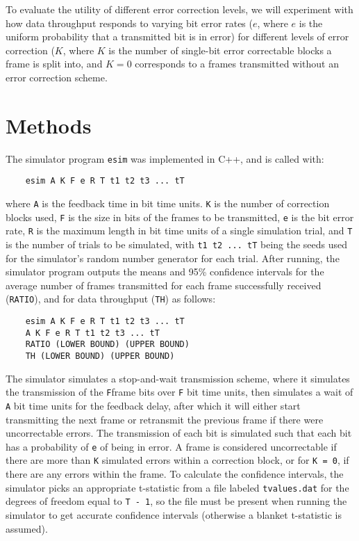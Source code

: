 \documentclass[twocolumn]{article}
\begin{document}
    To evaluate the utility of different error correction levels, we will experiment with 
    how data throughput responds to varying bit error rates ($e$, where $e$ is the 
    uniform probability that a transmitted bit is in error) for different levels of 
    error correction ($K$, where $K$ is the number of single-bit error correctable blocks 
    a frame is split into, and $K=0$ corresponds to a frames transmitted without an error 
    correction scheme. 

\section*{Methods}

    The simulator program \verb|esim| was implemented in C++, and is called with:
    \begin{lstlisting}
    esim A K F e R T t1 t2 t3 ... tT
    \end{lstlisting}
    where \verb|A| is the feedback time in bit time units. \verb|K| is the number
    of correction blocks used, \verb|F| is the size in bits of the frames to be transmitted,
    \verb|e| is the bit error rate, \verb|R| is the maximum length in bit time units of
    a single simulation trial, and \verb|T| is the number of trials to be simulated, with 
    \verb|t1 t2 ... tT| being the seeds used for the simulator's random number generator
    for each trial. After running, the simulator program outputs the means and 
    95\% confidence intervals for the average number of frames transmitted for each frame
    successfully received (\verb|RATIO|), and for data throughput (\verb|TH|) as follows:

    \begin{lstlisting}
    esim A K F e R T t1 t2 t3 ... tT
    A K F e R T t1 t2 t3 ... tT
    RATIO (LOWER BOUND) (UPPER BOUND)
    TH (LOWER BOUND) (UPPER BOUND)
    \end{lstlisting}

    The simulator simulates a stop-and-wait transmission scheme, where it simulates the 
    transmission of the \verb|F|frame bits over \verb|F| bit time units, then simulates
    a wait of \verb|A| bit time units for the feedback delay, after which it will either
    start transmitting the next frame or retransmit the previous frame if there were 
    uncorrectable errors. The transmission of each bit is simulated such that each bit
    has a probability of \verb|e| of being in error. A frame is considered uncorrectable
    if there are more than \verb|K| simulated errors within a correction block, or for
    \verb|K = 0|, if there are any errors within the frame. To calculate the confidence
    intervals, the simulator picks an appropriate t-statistic from a file labeled 
    \verb|tvalues.dat| for the degrees of freedom equal to \verb|T - 1|, so the file must 
    be present when running the simulator to get accurate confidence intervals (otherwise
    a blanket t-statistic is assumed).
\end{document}
